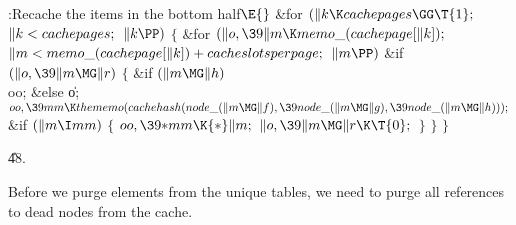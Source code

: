 \B{}:Recache the items in the bottom half\X${}\E{}$\6
\&{for} ${}(\|k\K\\{cachepages}\GG\T{1};{}$ ${}\|k<\\{cachepages};{}$ ${}\|k%
\PP){}$\5
${}\{{}$\1\6
\&{for} ${}(\|o,\39\|m\K\\{memo\_}(\\{cachepage}[\|k]);{}$ ${}\|m<\\{memo\_}(%
\\{cachepage}[\|k])+\\{cacheslotsperpage};{}$ ${}\|m\PP){}$\1\6
\&{if} ${}(\|o,\39\|m\MG\|r){}$\5
${}\{{}$\1\6
\&{if} ${}(\|m\MG\|h){}$\1\5
\\{oo};\5
\2\&{else}\1\5
\|o;\2\6
${}\\{oo},\39\\{mm}\K\\{thememo}(\\{cachehash}(\\{node\_}(\|m\MG\|f),\39\\{node%
\_}(\|m\MG\|g),\39\\{node\_}(\|m\MG\|h)));{}$\6
\&{if} ${}(\|m\I\\{mm}){}$\5
${}\{{}$\1\6
${}\\{oo},\39{*}\\{mm}\K{*}\|m;{}$\6
${}\|o,\39\|m\MG\|r\K\T{0};{}$\6
\4${}\}{}$\2\6
\4${}\}{}$\2\2\6
\4${}\}{}$\2\par
\U48.\fi

Before we purge elements from the unique tables, we need to
purge all
references to dead nodes from the cache.


